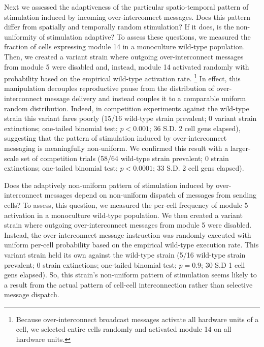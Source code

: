Next we assessed the adaptiveness of the particular spatio-temporal pattern of stimulation induced by incoming over-interconnect  messages.
Does this pattern differ from spatially and temporally random stimulation?
If it does, is the non-uniformity of stimulation adaptive?
To assess these questions, we measured the fraction of cells expressing module 14 in a monoculture wild-type population.
Then, we created a variant strain where outgoing over-interconnect messages from module 5 were disabled and, instead, module 14 activated randomly with probability based on the empirical wild-type activation rate.
\footnote{
Because over-interconnect broadcast messages activate all hardware units of a cell, we selected entire cells randomly and activated module 14 on all hardware units.
}
In effect, this manipulation decouples reproductive pause from the distribution of over-interconnect message delivery and instead couples it to a comparable uniform random distribution.
Indeed, in competition experiments against the wild-type strain this variant fares poorly (15/16 wild-type strain prevalent; 0 variant strain extinctions; one-tailed binomial test; $p < 0.001$; 36 S.D. 2 cell gens elapsed), suggesting that the pattern of stimulation induced by over-interconnect messaging is meaningfully non-uniform.
We confirmed this result with a larger-scale set of competition trials (58/64 wild-type strain prevalent; 0 strain extinctions; one-tailed binomial test; $p < 0.0001$; 33 S.D. 2 cell gens elapsed).

Does the adaptively non-uniform pattern of stimulation induced by over-interconnect messages depend on non-uniform dispatch of messages from sending cells?
To assess, this question, we measured the per-cell frequency of module 5 activation in a monoculture wild-type population.
We then created a variant strain where outgoing over-interconnect messages from module 5 were disabled.
Instead, the over-interconnect message instruction was randomly executed with uniform per-cell probability based on the empirical wild-type execution rate.
This variant strain held its own against the wild-type strain (5/16 wild-type strain prevalent; 0 strain extinctions; one-tailed binomial test; $p = 0.9$; 30 S.D 1 cell gens elapsed).
So, this strain's non-uniform pattern of stimulation seems likely to a result from the actual pattern of cell-cell interconnection rather than selective message dispatch.

